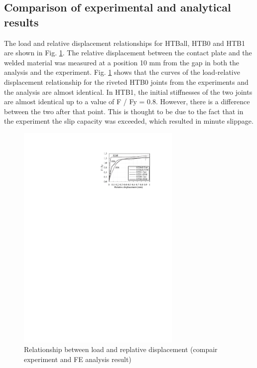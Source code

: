 \subsection{Comparison of experimental and analytical results}

The load and relative displacement relationships for HTBall, HTB0 and HTB1 are shown in Fig. \ref{ch4figA3}. The relative displacement between the contact plate and the welded material was measured at a position 10 mm from the gap in both the analysis and the experiment.
Fig. \ref{ch4figA3} shows that the curves of the load-relative displacement relationship for the riveted HTB0 joints from the experiments and the analysis are almost identical. In HTB1, the initial stiffnesses of the two joints are almost identical up to a value of F / Fy = 0.8. However, there is a difference between the two after that point. This is thought to be due to the fact that in the experiment the slip capacity was exceeded, which resulted in minute slippage.

\begin{figure}[htbp]
    \centering
    \includegraphics[width=0.7\textwidth]{imgs/ch4/figA3.pdf}
    \caption{Relationship between load and replative displacement (compair experiment and FE analysis result)}
    \label{ch4figA3}
\end{figure}

